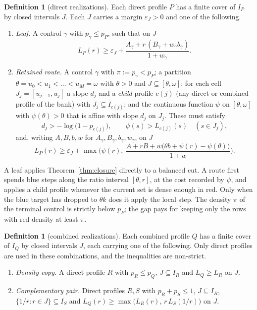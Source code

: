 \documentclass[11pt]{article}
\theoremstyle{definition}
\newtheorem{definition}[theorem]{Definition}
\theoremstyle{remark}
\begin{document}
\begin{definition}[direct realizations]
Each direct profile $P$ has a finite cover of $I_P$ by closed intervals $J$. Each $J$ carries a margin $\varepsilon_J>0$
and one of the following.
\begin{enumerate}[leftmargin=*]
\item \emph{Leaf.} A control $\gamma$ with $p_\gamma\le p_P$, such that on $J$
\[
L_P(r)\ge\varepsilon_J+\frac{A_\gamma+r\,(B_\gamma+w_\gamma b_\gamma)}{1+w_\gamma}.
\]
\item \emph{Retained route.} A control $\gamma$ with $\pi:=p_\gamma<p_P$; a partition
$\theta=u_0<u_1<\dots<u_M=\omega$ with $\theta>0$ and $J\subseteq[\theta,\omega]$; for each cell $J_j=[u_{j-1},u_j]$ a
slope $d_j$ and a \emph{child} profile $c(j)$ (any direct or combined profile of the bank) with $J_j\subseteq I_{c(j)}$; and
the continuous function $\psi$ on $[\theta,\omega]$ with $\psi(\theta)>0$ that is affine with slope $d_j$ on $J_j$.
These must satisfy
\begin{equation}\label{eq:route}
d_j>-\log\big(1-p_{c(j)}\big),\qquad \psi(s)>L_{c(j)}(s)\quad(s\in J_j),
\end{equation}
and, writing $A,B,b,w$ for $A_\gamma,B_\gamma,b_\gamma,w_\gamma$, on $J$
\[
L_P(r)\ge\varepsilon_J+\max\Big(\psi(r),\ \frac{A+rB+w\big(\theta b+\psi(r)-\psi(\theta)\big)}{1+w}\Big).
\]
\end{enumerate}
\end{definition}

A leaf applies Theorem~\ref{thm:closure} directly to a balanced cut. A route first spends blue steps along the ratio
interval $[\theta,r]$, at the cost recorded by $\psi$, and applies a child profile whenever the current set is dense
enough in red. Only when the blue target has dropped to $\theta k$ does it apply the local step. The density $\pi$ of
the terminal control is strictly below $p_P$; the gap pays for keeping only the rows with red density at least $\pi$.

\begin{definition}[combined realizations]
Each combined profile $Q$ has a finite cover of $I_Q$ by closed intervals $J$, each carrying one of the following.
Only direct profiles are used in these combinations, and the inequalities are non-strict.
\begin{enumerate}[leftmargin=*]
\item \emph{Density copy.} A direct profile $R$ with $p_R\le p_Q$, $J\subseteq I_R$ and $L_Q\ge L_R$ on $J$.
\item \emph{Complementary pair.} Direct profiles $R,S$ with $p_R+p_S\le1$, $J\subseteq I_R$, $\{1/r:r\in J\}\subseteq I_S$ and
$L_Q(r)\ge\max\big(L_R(r),\,r\,L_S(1/r)\big)$ on $J$.
\end{enumerate}
\end{definition}
\end{document}
